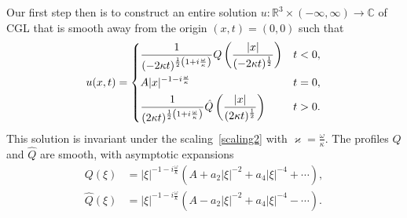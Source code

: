 \documentclass[11pt]{article}
\newcommand{\om}{\omega}
\newcommand{\RR}{\mathbb R}
\begin{document}
Our first step then is to construct an entire solution
\(u\colon\RR^{3}\times(-\infty,\infty)\to\mathbb{C}\) of CGL that is
smooth away from the origin \((x,t)=(0,0)\) such that
\begin{equation}\label{entire}
  u(x,t)=
  \begin{dcases}
    \frac{1}{(-2\kappa t)^{\frac{1}{2}\left(1+i\frac{\omega}{\kappa}\right)}}
    Q\left(\frac{|x|}{(-2\kappa t)^{\frac{1}{2}}}\right)
    & t<0,
    \\
    A|x|^{-1-i\frac{\omega}{\kappa}}
    & t=0,
    \\
    \frac{1}{(2\kappa t)^{\frac{1}{2}\left(1+i\frac{\omega}{\kappa}\right)}}
    \hat{Q}\left(\frac{|x|}{(2\kappa t)^{\frac{1}{2}}}\right)
    & t>0.
  \end{dcases}
\end{equation}
This solution is invariant under the scaling~\eqref{scaling2} with
\(\varkappa=\frac{\om}{\kappa}\). The profiles \(Q\) and \(\hat{Q}\)
are smooth, with asymptotic expansions
\begin{equation}\label{bcinfty}
  \begin{split}
    Q(\xi) & =|\xi|^{-1-i\frac{\om}{\kappa}}\left(A+a_2|\xi|^{-2}+a_4|\xi|^{-4}+\cdots\right),
    \\
    \hat{Q}(\xi) & =|\xi|^{-1-i\frac{\om}{\kappa}}\left(A-a_2|\xi|^{-2}+a_4|\xi|^{-4}-\cdots\right).
  \end{split}
\end{equation}
\end{document}
